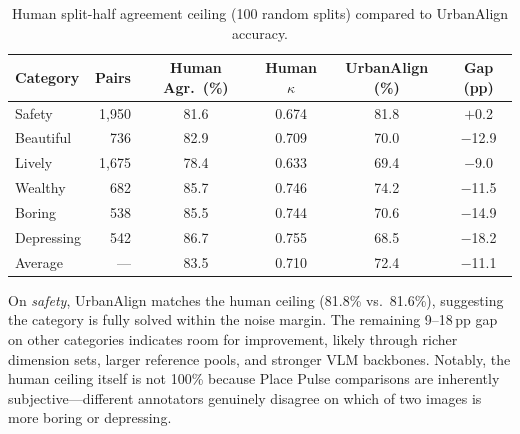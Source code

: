 \documentclass[runningheads]{llncs}
\begin{document}
{\begin{table}[H]
\centering
\caption{Human split-half agreement ceiling (100 random splits) compared to UrbanAlign accuracy.}
\label{tab:human_agreement}
\small
\begin{tabular}{lrcccc}
\toprule
\textbf{Category} & \textbf{Pairs} & \textbf{Human Agr.\ (\%)} & \textbf{Human $\kappa$} & \textbf{UrbanAlign (\%)} & \textbf{Gap (pp)} \\
\midrule
Safety      & 1,950 & 81.6 & 0.674 & 81.8 & $+$0.2 \\
Beautiful   &   736 & 82.9 & 0.709 & 70.0 & $-$12.9 \\
Lively      & 1,675 & 78.4 & 0.633 & 69.4 & $-$9.0 \\
Wealthy     &   682 & 85.7 & 0.746 & 74.2 & $-$11.5 \\
Boring      &   538 & 85.5 & 0.744 & 70.6 & $-$14.9 \\
Depressing  &   542 & 86.7 & 0.755 & 68.5 & $-$18.2 \\
\midrule
Average     & --- & 83.5 & 0.710 & 72.4 & $-$11.1 \\
\bottomrule
\end{tabular}
\end{table}

On \emph{safety}, UrbanAlign matches the human ceiling (81.8\% vs.\ 81.6\%), suggesting the category is fully solved within the noise margin.
The remaining 9--18\,pp gap on other categories indicates room for improvement, likely through richer dimension sets, larger reference pools, and stronger VLM backbones.
Notably, the human ceiling itself is not 100\% because Place Pulse comparisons are inherently subjective---different annotators genuinely disagree on which of two images is more boring or depressing.
}



\end{document}
